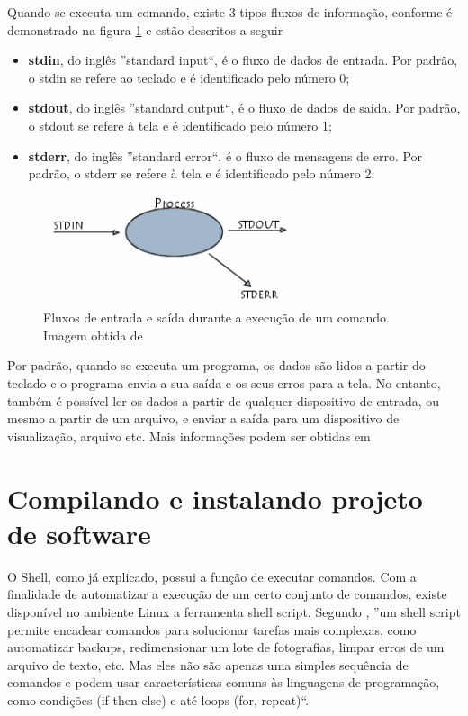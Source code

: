 Quando se executa um comando, existe 3 tipos fluxos de informação, conforme é demonstrado na figura \ref{fluxo_shell} e estão descritos a seguir

\begin{itemize}
	\item \textbf{stdin}, do inglês ''standard input``, é o fluxo de dados de entrada. Por padrão, o stdin se refere ao teclado e é identificado pelo número 0;
	\item \textbf{stdout}, do inglês ''standard output``, é o fluxo de dados de saída. Por padrão, o stdout se refere à tela e é identificado pelo número 1;
	\item \textbf{stderr}, do inglês ''standard error``, é o fluxo de mensagens de erro. Por padrão, o stderr se refere à tela e é identificado pelo número 2: 
\end{itemize}

\begin{figure}[H]
	\centering
	\includegraphics[width=0.65\textwidth]{variaveis/fluxo_shell.jpg}
	\caption{Fluxos de entrada e saída durante a execução de um comando. Imagem obtida de \cite{Shell}}
	\label{fluxo_shell}
\end{figure}



Por padrão, quando se executa um programa, os dados são lidos a partir do teclado e o programa envia a sua saída e os seus erros para a tela. No entanto, também é possível ler os dados a partir de qualquer dispositivo de entrada, ou mesmo a partir de um arquivo, e enviar a saída para um dispositivo de visualização, arquivo etc. Mais informações podem ser obtidas em \cite{Shell}

\section{Compilando e instalando projeto de software}

O Shell, como já explicado, possui a função de executar comandos. Com a finalidade de automatizar a execução de um certo conjunto de comandos, existe disponível no ambiente Linux a ferramenta shell script. Segundo \cite{script}, ''um shell script permite encadear comandos para solucionar tarefas mais complexas, como automatizar backups, redimensionar um lote de fotografias, limpar erros de um arquivo de texto, etc. Mas eles não são apenas uma simples sequência de comandos e podem usar características comuns às linguagens de programação, como condições (if-then-else) e até loops (for, repeat)``.

